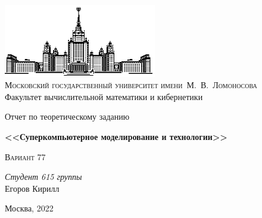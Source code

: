 \thispagestyle{empty}
\begin{center}
    \ \vspace{-3cm}

    \includegraphics[width=0.5\textwidth]{title_page/msu.eps}\\

    {\small{\scshape  Московский государственный университет имени~М.~В.~Ломоносова}\\
    Факультет вычислительной математики и кибернетики}

    \vfill

    {\Large Отчет по теоретическому заданию}

    \vspace{1cm}

    {\LARGE\bfseries <<Суперкомпьютерное моделирование и технологии>>}

    \vspace{1.5cm}

    {\scshape Вариант 77}
\end{center}

\vspace{3cm}

\begin{flushright}
    \large
    \textit{Студент 615 группы}\\
    Егоров Кирилл 
\end{flushright}

\vfill

\begin{center}
    Москва, 2022
\end{center}

\clearpage